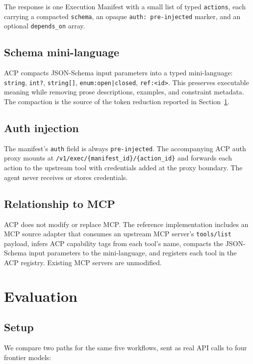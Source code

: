 \documentclass[11pt,a4paper]{article}
\begin{document}
The response is one Execution Manifest with a small list of typed
\texttt{actions}, each carrying a compacted \texttt{schema}, an opaque
\texttt{auth: pre-injected} marker, and an optional \texttt{depends\_on}
array.

\subsection{Schema mini-language}

ACP compacts JSON-Schema input parameters into a typed mini-language:
\texttt{string}, \texttt{int?}, \texttt{string[]},
\texttt{enum:open|closed}, \texttt{ref:<id>}. This preserves executable
meaning while removing prose descriptions, examples, and constraint
metadata. The compaction is the source of the token reduction reported in
Section~\ref{sec:eval}.

\subsection{Auth injection}

The manifest's \texttt{auth} field is always \texttt{pre-injected}. The
accompanying ACP auth proxy mounts at
\texttt{/v1/exec/\{manifest\_id\}/\{action\_id\}} and forwards each action
to the upstream tool with credentials added at the proxy boundary. The
agent never receives or stores credentials.

\subsection{Relationship to MCP}

ACP does not modify or replace MCP. The reference implementation includes
an MCP source adapter that consumes an upstream MCP server's
\texttt{tools/list} payload, infers ACP capability tags from each tool's
name, compacts the JSON-Schema input parameters to the mini-language, and
registers each tool in the ACP registry. Existing MCP servers are
unmodified.

\section{Evaluation}\label{sec:eval}

\subsection{Setup}

We compare two paths for the same five workflows, sent as real API calls
to four frontier models:
\end{document}
